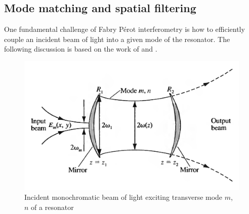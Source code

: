 \subsection{Mode matching and spatial filtering}

One fundamental challenge of Fabry Pérot interferometry is how to efficiently couple an incident beam of light into a given mode of the resonator.
The following discussion is based on the work of \textcite{yariv_photonics:_2007} and \textcite{meschede_optik_2008}.
\begin{figure}[H]
	\centering
	\includegraphics[width=0.7\linewidth]{figures/fabry-perot/excitation-of-transverse-mode}
	\caption{Incident monochromatic beam of light exciting transverse mode $m$, $n$ of a resonator~\cite{yariv_photonics:_2007}}
	\label{fig:excitation-of-transverse-mode}
\end{figure}

